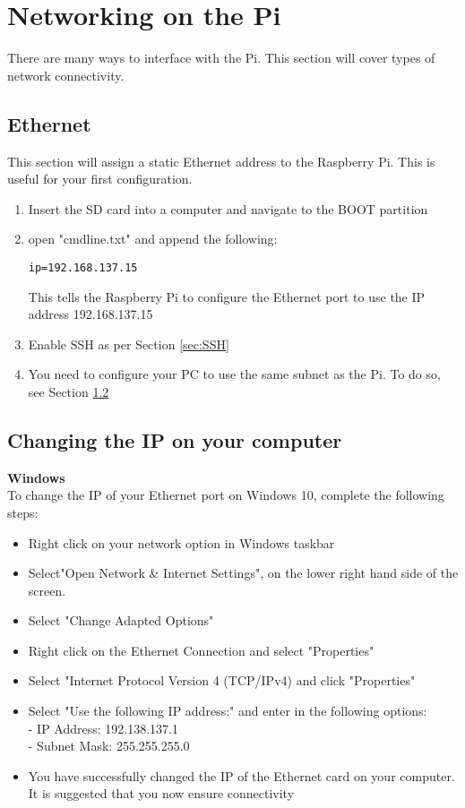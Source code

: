 \section{Networking on the Pi}
\label{app:NetworkingOnThePi}
There are many ways to interface with the Pi. This section will cover types of network connectivity.

\subsection{Ethernet}
\label{sec:Connectivity-Ethernet}
This section will assign a static Ethernet address to the Raspberry Pi. This is useful for your first configuration.
\begin{enumerate}
    \item Insert the SD card into a computer and navigate to the BOOT partition
    \item open "cmdline.txt" and append the following:
        \begin{verbatim}ip=192.168.137.15\end{verbatim} 
        This tells the Raspberry Pi to configure the Ethernet port to use the IP address 192.168.137.15
    \item Enable SSH as per Section \ref{sec:SSH}
    \item You need to configure your PC to use the same subnet as the Pi. To do so, see Section \ref{sec:Connectivity-ChangeComputerIP}
\end{enumerate}

\subsection{Changing the IP on your computer}
\label{sec:Connectivity-ChangeComputerIP}
\textbf{Windows}\\
To change the IP of your Ethernet port on Windows 10, complete the following steps:
\begin{itemize}
    \item Right click on your network option in Windows taskbar
    \item Select"Open Network \& Internet Settings", on the lower right hand side of the screen.
    \item Select "Change Adapted Options"
    \item Right click on the Ethernet Connection and select "Properties"
    \item Select "Internet Protocol Version 4 (TCP/IPv4) and click "Properties"
    \item Select "Use the following IP address:" and enter in the following options:\\
            - IP Address: 192.138.137.1\\
            - Subnet Mask: 255.255.255.0
    \item You have successfully changed the IP of the Ethernet card on your computer. It is suggested that you now ensure connectivity
\end{itemize}


